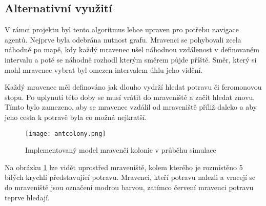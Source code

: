 \subsection{Alternativní využití}
V rámci projektu byl tento algoritmus lehce upraven pro potřebu navigace agentů. Nejprve byla odebrána nutnost grafu. Mravenci se pohybovali zcela náhodně po mapě, kdy každý mravenec ušel náhodnou vzdálenost v definovaném intervalu a poté se náhodně rozhodl kterým směrem půjde příště. Směr, který si mohl mravenec vybrat byl omezen intervalem úhlu jeho vidění. 
\par
Každý mravenec měl definováno jak dlouho vydrží hledat potravu či feromonovou stopu. Po uplynutí této doby se musí vrátit do mraveniště a začít hledat znovu. Tímto bylo zamezeno, aby se mravenec vzdálil od mraveniště příliž daleko a aby jeho cesta k potravě byla co možná nejkratší. 
\begin{figure}[H]
	\texttt{[image: antcolony.png]}
	\centering
	\caption{Implementovaný model mravenčí kolonie v průběhu simulace}
	\label{fig:antcolony}
\end{figure}
Na obrázku \ref{fig:antcolony} lze vidět uprostřed mraveniště, kolem kterého je rozmístěno 5 bílých krychlí představující potravu. Mravenci, kteří potravu nalezli a vracejí se do mraveniště jsou označeni modrou barvou, zatímco červení mravenci potravu teprve hledají. 